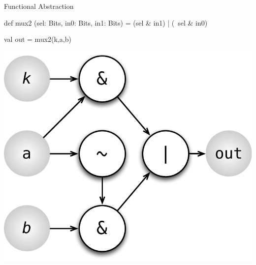 \documentclass[xcolor=pdflatex,dvipsnames,table]{beamer}
\begin{document}
\begin{frame}[fragile]{Functional Abstraction}
\begin{scala}
def mux2 (sel: Bits, in0: Bits, in1: Bits) = 
  (sel & in1) | (~sel & in0)

val out = mux2(k,a,b)
\end{scala}
\begin{center}
\includegraphics[height=0.7\textheight]{figs/mux2-function.pdf} 
\end{center}
\end{frame}
\end{document}
